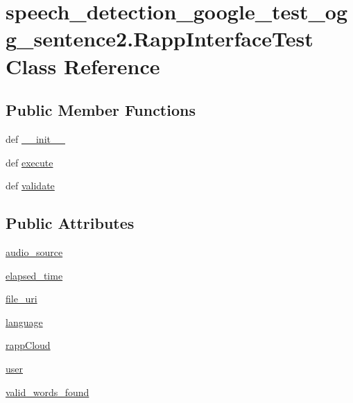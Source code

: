 \hypertarget{classspeech__detection__google__test__ogg__sentence2_1_1RappInterfaceTest}{\section{speech\-\_\-detection\-\_\-google\-\_\-test\-\_\-ogg\-\_\-sentence2.\-Rapp\-Interface\-Test Class Reference}
\label{classspeech__detection__google__test__ogg__sentence2_1_1RappInterfaceTest}
}
\subsection*{Public Member Functions}
\begin{DoxyCompactItemize}
\item 
def \hyperlink{classspeech__detection__google__test__ogg__sentence2_1_1RappInterfaceTest_ad554c94c356c13d1d420eee1c29c3a04}{\-\_\-\-\_\-init\-\_\-\-\_\-}
\item 
def \hyperlink{classspeech__detection__google__test__ogg__sentence2_1_1RappInterfaceTest_a267646b98ec523a23dfd85e56d0430fd}{execute}
\item 
def \hyperlink{classspeech__detection__google__test__ogg__sentence2_1_1RappInterfaceTest_afea4b5c70a8edbb5b0c79d105783c6e7}{validate}
\end{DoxyCompactItemize}
\subsection*{Public Attributes}
\begin{DoxyCompactItemize}
\item 
\hyperlink{classspeech__detection__google__test__ogg__sentence2_1_1RappInterfaceTest_a13e256ef14121e4fc5863f9b1bafe265}{audio\-\_\-source}
\item 
\hyperlink{classspeech__detection__google__test__ogg__sentence2_1_1RappInterfaceTest_a63e97f58cceb38c889d29b5ce14197f9}{elapsed\-\_\-time}
\item 
\hyperlink{classspeech__detection__google__test__ogg__sentence2_1_1RappInterfaceTest_a37b6ddb7e760edb7ad712086e3941b70}{file\-\_\-uri}
\item 
\hyperlink{classspeech__detection__google__test__ogg__sentence2_1_1RappInterfaceTest_aaf1e0e8f7883912b566f85f221b40455}{language}
\item 
\hyperlink{classspeech__detection__google__test__ogg__sentence2_1_1RappInterfaceTest_a6033681c1172ab3bc54ab2633201a3dc}{rapp\-Cloud}
\item 
\hyperlink{classspeech__detection__google__test__ogg__sentence2_1_1RappInterfaceTest_acce3ca28f6848f3ba4e6a3f945dd9bf7}{user}
\item 
\hyperlink{classspeech__detection__google__test__ogg__sentence2_1_1RappInterfaceTest_afa9a6449293346d27b73fc6e379cc70e}{valid\-\_\-words\-\_\-found}
\end{DoxyCompactItemize}


